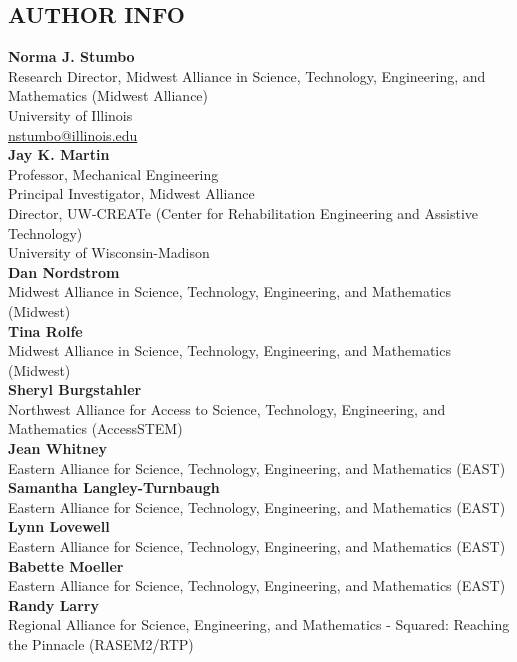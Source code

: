 \documentclass[11.5pt]{sig-alternate} %
\begin{document}
\begin{large}
\section*{AUTHOR INFO}
\textbf{Norma J. Stumbo}\\
Research Director, Midwest Alliance in Science, Technology, Engineering, and Mathematics (Midwest Alliance)\\
University of Illinois\\
\href{mailto:nstumbo@illinois.edu}{nstumbo@illinois.edu}\\

\textbf{Jay K. Martin}\\
Professor, Mechanical Engineering\\
Principal Investigator, Midwest Alliance\\
Director, UW-CREATe (Center for Rehabilitation Engineering and Assistive Technology)\\
University of Wisconsin-Madison\\

\textbf{Dan Nordstrom}\\
Midwest Alliance in Science, Technology, Engineering, and Mathematics (Midwest)\\

\textbf{Tina Rolfe}\\
Midwest Alliance in Science, Technology, Engineering, and Mathematics (Midwest)\\

\textbf{Sheryl Burgstahler}\\
Northwest Alliance for Access to Science, Technology, Engineering, and Mathematics (Access\-STEM)\\

\textbf{Jean Whitney}\\
Eastern Alliance for Science, Technology, Engineering, and Mathematics (EAST)\\

\textbf{Samantha Langley-Turnbaugh}\\
Eastern Alliance for Science, Technology, Engineering, and Mathematics (EAST)\\

\textbf{Lynn Lovewell}\\
Eastern Alliance for Science, Technology, Engineering, and Mathematics (EAST)\\

\textbf{Babette Moeller}\\
Eastern Alliance for Science, Technology, Engineering, and Mathematics (EAST)\\

\textbf{Randy Larry}\\
Regional Alliance for Science, Engineering, and Mathematics - Squared: Reaching the Pinnacle (RASEM2/RTP)\\

\end{large}
\clearpage
\end{document}
